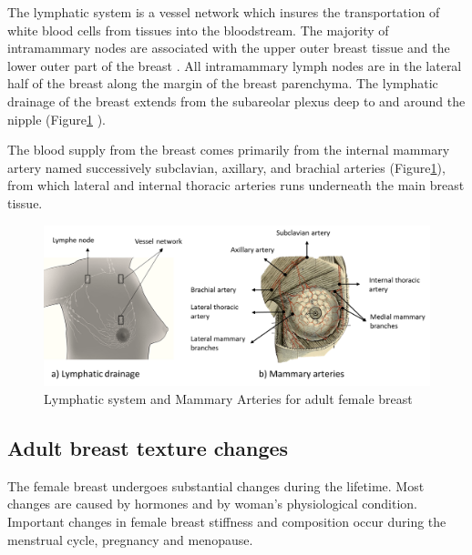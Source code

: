 The lymphatic system is a vessel network which insures the transportation of white blood cells from tissues into the bloodstream. The majority of intramammary nodes are associated with the upper outer breast tissue and the lower outer part of the breast \citep{kopans2007breast}.  All intramammary lymph nodes are in the lateral half of the breast along the margin of the breast parenchyma.  The lymphatic drainage of the breast extends from the subareolar plexus deep to and around the nipple (Figure\ref{fig:lyphaticDrainageandArtery} ).

The blood supply from the breast comes primarily from the internal mammary artery named successively subclavian, axillary, and brachial arteries (Figure\ref{fig:lyphaticDrainageandArtery}), from which lateral and internal thoracic arteries runs underneath the main breast tissue.

	
\begin{figure}[!h]
\centering
\includegraphics[width=\textwidth,keepaspectratio]{figures/lyphaticDrainageandArtery.PNG} 
\caption[Lymphatic system and Mammary Arteries for adult female breast]{Lymphatic system and Mammary Arteries for adult female breast}
\label{fig:lyphaticDrainageandArtery}
\end{figure}





\subsection{Adult breast texture changes}\label{subsection:adultbreasttexturechanges}

The female breast undergoes substantial changes during the lifetime.  Most changes are caused by hormones and by woman's physiological condition. Important changes in female breast stiffness and composition occur during the menstrual cycle, pregnancy and menopause. 

